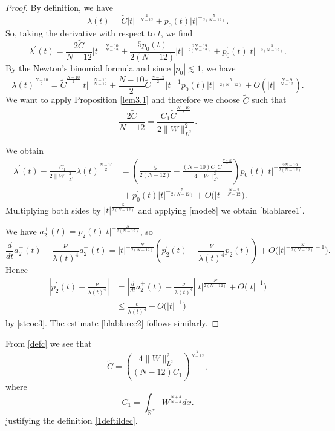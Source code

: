 \documentclass[a4paper,two-side,10pt]{amsart}
\newcommand{\R}{\mathbb{R}}
\numberwithin{equation}{section}
\begin{document}
\begin{proof}
By definition, we have
$$\lambda (t)= \tilde{C} |t|^{-\frac{2}{N-12}}+ p_0 (t) |t|^{-\frac{5}{2(N-12)}}.$$
So, taking the derivative with respect to $t$, we find
$$\lambda^\prime (t)= \frac{2\tilde{C}}{N-12} |t|^{-\frac{N-10}{N-12}} + \frac{5p_0 (t)}{2(N-12)} |t|^{-\frac{2N-19}{2(N-12)}} + p_0^\prime (t)|t|^{-\frac{5}{2(N-12)}}. $$
By the Newton's binomial formula and since $|p_0| \lesssim 1$, we have
$$\lambda (t)^{\frac{N-10}{2}}= \tilde{C}^{\frac{N-10}{2}} |t|^{-\frac{N-10}{N-12}} + \frac{N-10}{2} \tilde{C}^{\frac{N-12}{2}} |t|^{-1} p_0 (t) |t|^{-\frac{5}{2(N-12)}}+ O(|t|^{-\frac{N-9}{N-12}}). $$
We want to apply Proposition \ref{lem3.1} and therefore we choose $\tilde{C}$ such that 
\begin{equation}\label{defc}
\frac{2\tilde{C}}{N-12}= \frac{C_1 \tilde{C}^{\frac{N-10}{2}}}{2\|W\|_{L^2}^2}.
\end{equation}

We obtain 
\begin{align*}
\lambda^\prime (t) - \frac{C_1}{2 \|W\|_{L^2}^2} \lambda (t)^{\frac{N-10}{2}} &
 = \left(\frac{5}{2(N-12)} - \frac{(N-10)C_1 \tilde{C}^{\frac{N-12}{2}}}{4 \|W\|_{L^2}^2} \right)p_0 (t) |t|^{-\frac{2N-19}{2(N-12)}} \\
 &\ + p_0^\prime (t)|t|^{-\frac{5}{2(N-12)}} + O\big(|t|^{-\frac{N-9}{N-12}}\big). 
\end{align*}
Multiplying both sides by $|t|^{\tfrac{5}{2(N-12)}}$ and applying \eqref{mode8}
we obtain \eqref{blablaree1}.

We have $a_2^+ (t)=  p_2 (t)|t|^{-\tfrac{N}{2(N-12)}}$, so
$$\frac{d}{dt}a_2^+(t) - \frac{\nu}{\lambda(t)^4}a_2^+(t) = |t|^{- \frac{N}{2(N-12)}} \left(p_2^\prime (t) - \frac{\nu}{\lambda(t)^4} p_2 (t)\right) + O\big(|t|^{-\frac{N}{2 (N-12)} -1}\big).$$
Hence
\begin{align*}
\left|p_2^\prime (t)-\frac{\nu}{\lambda(t)^4}\right|
&=\left|\frac{d}{dt}a_2^+(t)-\frac{\nu}{\lambda(t)^4}\right||t|^{\frac{N}{2(N-12)}} +O\big(|t|^{-1}\big)\\
&\le \frac{c}{\lambda(t)^4}+O\big(|t|^{-1}\big)
\end{align*}
by \eqref{stcoe3}. The estimate \eqref{blablaree2} follows similarly.
\end{proof}

From \eqref{defc} we see that 
\[
\tilde{C}=\left(\frac{4\|W\|_{L^2}^2}{(N-12)C_1}\right)^{\frac{2}{N-12}},
\]
where
\[
C_1=\int_{\R^N} W^{\frac{N+4}{N-4}} dx.
\]
justifying the definition \eqref{1deftildec}.
\end{document}
